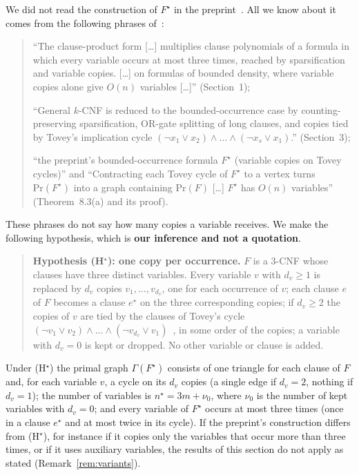 \documentclass[11pt,a4paper]{article}
\theoremstyle{definition}
\theoremstyle{remark}
\newcommand{\Gr}{\Gamma}
\begin{document}
We did not read the construction of $F^\star$ in the preprint~\cite{OpenAI}. All we know
about it comes from the following phrases of~\cite{DL}:
\begin{quote}
``The clause-product form [\dots] multiplies clause polynomials of a formula in which every
variable occurs at most three times, reached by sparsification and variable copies. [\dots]
on formulas of bounded density, where variable copies alone give $O(n)$ variables [\dots]''
(Section~1);

``General $k$-CNF is reduced to the bounded-occurrence case by counting-preserving
sparsification, OR-gate splitting of long clauses, and copies tied by Tovey's implication
cycle $(\neg x_1\vee x_2)\wedge\dots\wedge(\neg x_s\vee x_1)$.'' (Section~3);

``the preprint's bounded-occurrence formula $F^\star$ (variable copies on Tovey cycles)''
and ``Contracting each Tovey cycle of $F^\star$ to a vertex turns $\mathrm{Pr}(F^\star)$
into a graph containing $\mathrm{Pr}(F)$ [\dots] $F^\star$ has $O(n)$ variables''
(Theorem~8.3(a) and its proof).
\end{quote}
These phrases do not say how many copies a variable receives. We make the following
hypothesis, which is \textbf{our inference and not a quotation}.

\begin{quote}
\textbf{Hypothesis (H$^\star$): one copy per occurrence.} $F$ is a 3-CNF whose clauses have
three distinct variables. Every variable $v$ with $d_v\ge1$ is replaced by $d_v$ copies
$v_1,\dots,v_{d_v}$, one for each occurrence of $v$; each clause $e$ of $F$ becomes a clause
$e^\star$ on the three corresponding copies; if $d_v\ge2$ the copies of $v$ are tied by the
clauses of Tovey's cycle
$(\neg v_1\vee v_2)\wedge\dots\wedge(\neg v_{d_v}\vee v_1)$~\cite{Tov84}, in some order of
the copies; a variable with $d_v=0$ is kept or dropped. No other variable or clause is
added.
\end{quote}
Under (H$^\star$) the primal graph $\Gr(F^\star)$ consists of one triangle for each clause
of $F$ and, for each variable $v$, a cycle on its $d_v$ copies (a single edge if $d_v=2$,
nothing if $d_v=1$); the number of variables is $n^\star=3m+\nu_0$, where $\nu_0$ is the
number of kept variables with $d_v=0$; and every variable of $F^\star$ occurs at most three
times (once in a clause $e^\star$ and at most twice in its cycle). If the preprint's
construction differs from (H$^\star$), for instance if it copies only the variables that
occur more than three times, or if it uses auxiliary variables, the results of this section
do not apply as stated (Remark~\ref{rem:variants}).
\end{document}
